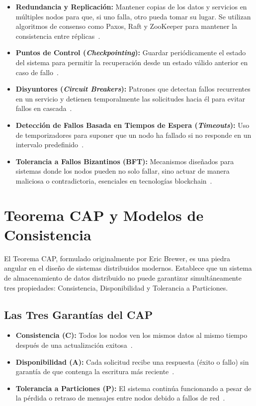 \documentclass[12pt,a4paper]{article}
\begin{document}
\begin{itemize}
    \item \textbf{Redundancia y Replicación:} Mantener copias de los datos y servicios en múltiples nodos para que, si uno falla, otro pueda tomar su lugar. Se utilizan algoritmos de consenso como Paxos, Raft y ZooKeeper para mantener la consistencia entre réplicas~\cite{r17}.

    \item \textbf{Puntos de Control (\textit{Checkpointing}):} Guardar periódicamente el estado del sistema para permitir la recuperación desde un estado válido anterior en caso de fallo~\cite{r18}.

    \item \textbf{Disyuntores (\textit{Circuit Breakers}):} Patrones que detectan fallos recurrentes en un servicio y detienen temporalmente las solicitudes hacia él para evitar fallos en cascada~\cite{r09}.

    \item \textbf{Detección de Fallos Basada en Tiempos de Espera (\textit{Timeouts}):} Uso de temporizadores para suponer que un nodo ha fallado si no responde en un intervalo predefinido~\cite{r19}.

    \item \textbf{Tolerancia a Fallos Bizantinos (BFT):} Mecanismos diseñados para sistemas donde los nodos pueden no solo fallar, sino actuar de manera maliciosa o contradictoria, esenciales en tecnologías blockchain~\cite{r20}.
\end{itemize}

\section{Teorema CAP y Modelos de Consistencia}

El Teorema CAP, formulado originalmente por Eric Brewer, es una piedra angular en el diseño de sistemas distribuidos modernos. Establece que un sistema de almacenamiento de datos distribuido no puede garantizar simultáneamente tres propiedades: Consistencia, Disponibilidad y Tolerancia a Particiones.

\subsection{Las Tres Garantías del CAP}

\begin{itemize}
    \item \textbf{Consistencia (C):} Todos los nodos ven los mismos datos al mismo tiempo después de una actualización exitosa~\cite{r21}.

    \item \textbf{Disponibilidad (A):} Cada solicitud recibe una respuesta (éxito o fallo) sin garantía de que contenga la escritura más reciente~\cite{r22}.

    \item \textbf{Tolerancia a Particiones (P):} El sistema continúa funcionando a pesar de la pérdida o retraso de mensajes entre nodos debido a fallos de red~\cite{r23}.
\end{itemize}
\end{document}
